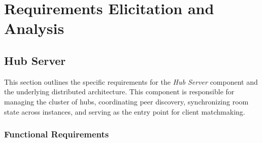 \section{Requirements Elicitation and Analysis}\label{requirements}

\subsection{Hub Server}
This section outlines the specific requirements for the \textit{Hub Server} component and the underlying distributed architecture.
This component is responsible for managing the cluster of hubs, coordinating peer discovery, synchronizing room state across instances, and serving as the entry point for client matchmaking.

\subsubsection{Functional Requirements}
